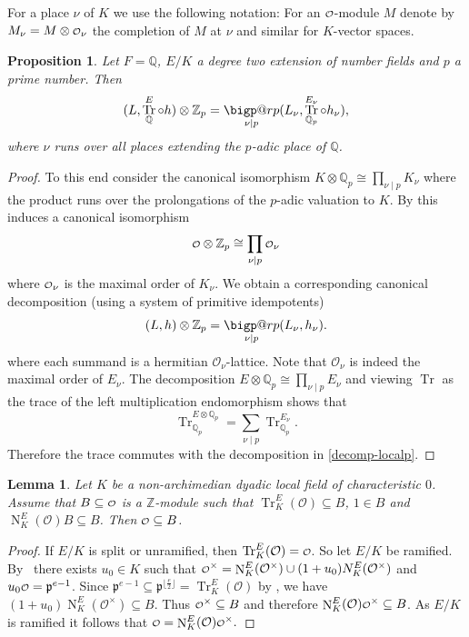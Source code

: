 \documentclass[a4paper]{amsart}
\makeatletter
\theoremstyle{definition}
\theoremstyle{plain}
\newtheorem{lemma}[definition]{Lemma}
\newtheorem{proposition}[definition]{Proposition}
\DeclareMathOperator{\Tr}{Tr}
\DeclareMathOperator{\Nr}{N}
\newcommand{\QQ}{\mathbb{Q}}
\newcommand{\ZZ}{\mathbb{Z}}
\renewcommand{\O}{\mathcal{O}}
\newcommand{\fp}{\mathfrak{p}}
\renewcommand\o{
  \mathchoice
    {{\scriptstyle\mathcal{O}}}%
    {{\scriptstyle\mathcal{O}}}%
    {{\scriptscriptstyle\mathcal{O}}}%
    {\scalebox{.7}{$\scriptscriptstyle\mathcal{O}$}}%
  }
\newcommand{\bigperp}{%
  \mathop{\mathpalette\bigp@rp\relax}%
  \displaylimits
}
\newcommand{\bigp@rp}[2]{%
  \vcenter{
    \m@th\hbox{\scalebox{\ifx#1\displaystyle2.1\else1.5\fi}{$#1\perp$}}
  }%
}
\makeatother
\begin{document}
For a place $\nu$ of $K$ we use the following notation:
For an $\o$-module $M$ denote by $M_\nu = M \otimes \o_\nu$ the completion of $M$ at $\nu$ and similar for $K$-vector spaces.


\begin{proposition}\label{prop:tracedecompose}
  Let $F = \QQ$, $E/K$ a degree two extension of number fields and $p$ a prime number.
  Then
  \begin{equation}\label{decomp-local}
    (L,\Tr^E_\QQ \circ h) \otimes \ZZ_p = \bigperp_{\nu \mid p} (L_\nu, \Tr^{E_\nu}_{\QQ_p} \circ h_\nu),
  \end{equation}
  where $\nu$ runs over all places extending the $p$-adic place of $\QQ$.
\end{proposition}
\begin{proof}
To this end consider the canonical isomorphism $K \otimes \QQ_p \cong \prod_{\nu \mid p} K_\nu$ where the product runs over the prolongations of the $p$-adic valuation to $K$.
By \cite[Chap. II, \S3, Prop. 4]{Serre1979} this induces a canonical isomorphism
\[\o \otimes \ZZ_p \cong \prod_{\nu \mid p} \o_\nu\]
where $\o_\nu$ is the maximal order of $K_\nu$.
We obtain a corresponding canonical decomposition (using a system of primitive idempotents)
\begin{equation}\label{decomp-localp}
(L,h) \otimes \ZZ_p = \bigperp_{\nu \mid p} (L_\nu,h_\nu).
\end{equation}
  where each summand is a hermitian $\O_\nu$-lattice.
  Note that $\O_\nu$ is indeed the maximal order of $E_\nu$.
The decomposition $E \otimes \QQ_p \cong \prod_{\nu \mid p} E_\nu$
and viewing $\Tr$ as the trace of the left multiplication endomorphism shows that
\[\Tr^{E \otimes \QQ_p}_{\QQ_p}= \sum_{\nu \mid p} \Tr^{E_\nu}_{\QQ_p}.\]
Therefore the trace commutes with the decomposition in \cref{decomp-localp}.
\end{proof}


\begin{lemma}\label{normhelp}
  Let $K$ be a non-archimedian dyadic local field of characteristic $0$.
  Assume that $B \subseteq \o$ is a $\ZZ$-module such that $\Tr^E_K(\O) \subseteq B$, $1 \in B$ and $\Nr^E_K(\O)B \subseteq B$. Then $\o \subseteq B$.
\end{lemma}

\begin{proof}
If $E/K$ is split or unramified, then $\Tr^E_K(\O)=\o$. So let $E/K$ be ramified.
  By~\cite[\S 6]{Johnson1968} there exists $u_0 \in K$ such that $\o^\times = \Nr^E_K(\O^\times) \cup (1+u_0) N^E_K(\O^\times)$ and $u_0 \o = \fp^{e-1}$. Since $\fp^{e-1} \subseteq \fp^{\lfloor\frac{e}{2}\rfloor}=\Tr^E_K(\O)$ by \cite[Ch. V,\S3, Lemma 3]{Serre1979}, we have $(1+u_0) \Nr^E_K(\O^\times) \subseteq B$.
  Thus $\o^\times \subseteq B$ and therefore $\Nr^E_K(\O) \o^\times \subseteq B$. As $E/K$ is ramified it follows that $\o= \Nr^E_K(\O) \o^\times.$
\end{proof}
\end{document}
